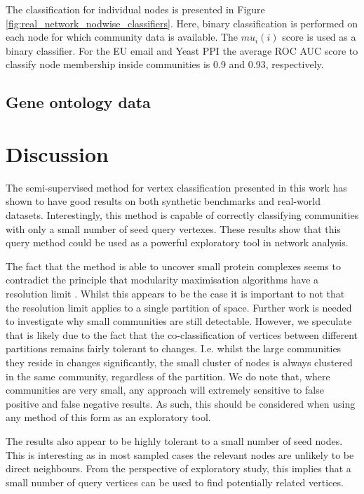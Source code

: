 \documentclass[sigconf]{acmart}
\begin{document}
The classification for individual nodes is presented in Figure \ref{fig:real_network_nodwise_classifiers}.
Here, binary classification is performed on each node for which community data is available.
The $mu_i({i})$ score is used as a binary classifier.
For the EU email and Yeast PPI the average ROC AUC score to classify node membership inside communities is 0.9 and 0.93, respectively.

\subsection{Gene ontology data}
\label{sec:go_labels}

\section{Discussion}
The semi-supervised method for vertex classification presented in this work has shown to have good results on both synthetic benchmarks and real-world datasets.
Interestingly, this method is capable of correctly classifying communities with only a small number of seed query vertexes.
These results show that this query method could be used as a powerful exploratory tool in network analysis.

The fact that the method is able to uncover small protein complexes seems to contradict the principle that modularity maximisation algorithms have a resolution limit \cite{fortunato2007resolution}.
Whilst this appears to be the case it is important to not that the resolution limit applies to a single partition of space.
Further work is needed to investigate why small communities are still detectable.
However, we speculate that is likely due to the fact that the co-classification of vertices between different partitions remains fairly tolerant to changes.
I.e. whilst the large communities they reside in changes significantly, the small cluster of nodes is always clustered in the same community, regardless of the partition.
We do note that, where communities are very small, any approach will extremely sensitive to false positive and false negative results.
As such, this should be considered when using any method of this form as an exploratory tool.

The results also appear to be highly tolerant to a small number of seed nodes.
This is interesting as in most sampled cases the relevant nodes are unlikely to be direct neighbours.
From the perspective of exploratory study, this implies that a small number of query vertices can be used to find potentially related vertices.
\end{document}

